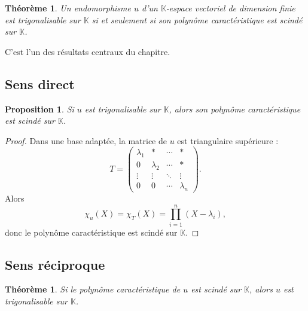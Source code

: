 \documentclass[11pt,a4paper]{article}
\newtheorem{theoreme}[definition]{Théorème}
\newtheorem{proposition}[definition]{Proposition}
\theoremstyle{remark}
\newcommand{\K}{\mathbb{K}}
\begin{document}
\begin{theoreme}
Un endomorphisme \(u\) d’un \(\K\)-espace vectoriel de dimension finie est trigonalisable sur \(\K\) si et seulement si son polynôme caractéristique est scindé sur \(\K\).
\end{theoreme}

C’est l’un des résultats centraux du chapitre.

\subsection{Sens direct}

\begin{proposition}
Si \(u\) est trigonalisable sur \(\K\), alors son polynôme caractéristique est scindé sur \(\K\).
\end{proposition}

\begin{proof}
Dans une base adaptée, la matrice de \(u\) est triangulaire supérieure :
\[
T=
\begin{pmatrix}
\lambda_1 & * & \cdots & *\\
0 & \lambda_2 & \cdots & *\\
\vdots & \vdots & \ddots & \vdots\\
0 & 0 & \cdots & \lambda_n
\end{pmatrix}.
\]
Alors
\[
\chi_u(X)=\chi_T(X)=\prod_{i=1}^n (X-\lambda_i),
\]
donc le polynôme caractéristique est scindé sur \(\K\).
\end{proof}

\subsection{Sens réciproque}

\begin{theoreme}
Si le polynôme caractéristique de \(u\) est scindé sur \(\K\), alors \(u\) est trigonalisable sur \(\K\).
\end{theoreme}
\end{document}

